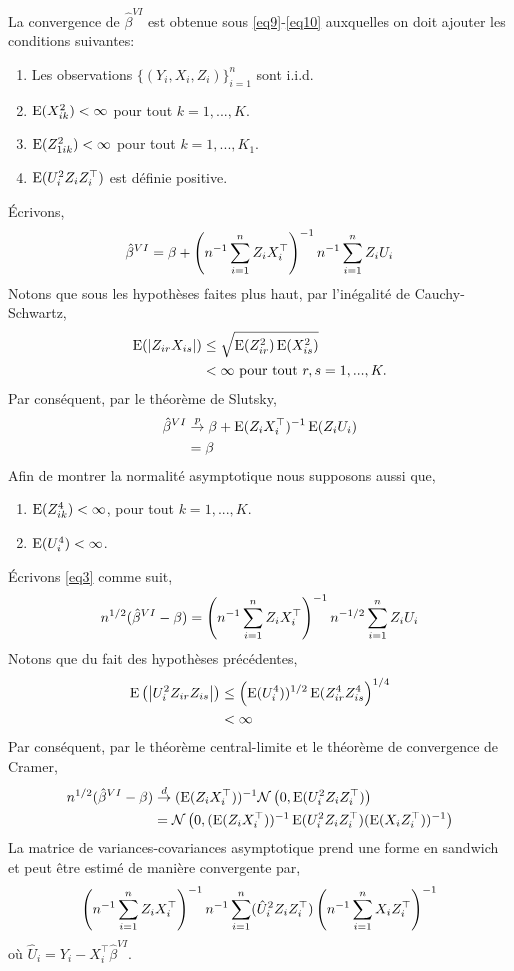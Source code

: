 La convergence de $\hat{\beta}^{VI}$ est obtenue sous \eqref{eq9}-\eqref{eq10} auxquelles on doit 
ajouter les conditions suivantes:
\begin{enumerate}[label = (B.\arabic*)]
\item Les observations $\{(Y_i, X_i, Z_i)\}_{i=1}^n$ sont i.i.d.
\item $\operatorname{E}(X_{ik}^2) < \infty$ pour tout $k=1,...,K$.
\item $\operatorname{E}(Z_{1ik}^2) < \infty$ pour tout $k=1,...,K_1$.
\item $\operatorname{E}(U_i^2Z_iZ_i^\top)$ est définie positive.
\end{enumerate}
\'Ecrivons,
\begin{align}
\hat{\beta}^{VI} = \beta + \left(n^{-1}\sum_{i=1}^n Z_iX_i^\top\right)^{-1}n^{-1}\sum_{i=1}^n Z_iU_i
\label{eq3}
\end{align}
Notons que sous les hypothèses faites plus haut, par l'inégalité de Cauchy-Schwartz,
\begin{align*}
\operatorname{E}(\left\vert {Z_{ir}X_{is}} \right\vert) &\leq \sqrt{\operatorname{E}(Z_{ir}^2)\operatorname{E}(X_{is}^2)}\\
&< \infty \ \textrm{pour tout} \ r, s = 1,...,K.
\end{align*}
Par conséquent, par le théorème de Slutsky,
\begin{align*}
\hat{\beta}^{VI}  &\overset{p}{\rightarrow} \beta + \operatorname{E}(Z_iX_i^\top)^{-1}\operatorname{E}(Z_iU_i)\\
&= \beta
\end{align*}
Afin de montrer la normalité asymptotique nous supposons aussi que,
\begin{enumerate}[label = (B.\arabic*), resume]
\item $\operatorname{E}(Z_{ik}^4) < \infty$, pour tout $k=1,...,K$. 
\item $\operatorname{E}(U_i^4)<\infty$.
\end{enumerate}
\'Ecrivons \eqref{eq3} comme suit,
\begin{align*}
n^{1/2}(\hat{\beta}^{VI} - \beta ) = \left(n^{-1}\sum_{i=1}^n Z_iX_i^\top\right)^{-1}n^{-1/2} \sum_{i=1}^n Z_iU_i
\end{align*}
Notons que du fait des hypothèses précédentes,
\begin{align*}
\operatorname{E}\left(\left\vert {U_i^2Z_{ir}Z_{is}} \right\vert\right) &\leq \left(\operatorname{E}(U_i^4))^{1/2}\operatorname{E}(Z_{ir}^4Z_{is}^4\right)^{1/4}\\
& < \infty
\end{align*}
Par conséquent, par le théorème central-limite et le théorème de convergence de Cramer,
\begin{align*}
n^{1/2}(\hat{\beta}^{VI} - \beta ) &\overset{d}{\rightarrow} (\operatorname{E}(Z_iX_i^\top))^{-1}\mathcal{N}\left(0,\operatorname{E}(U_i^2Z_iZ_i^\top)\right)\\
&=\mathcal{N}\left(0,  (\operatorname{E}(Z_iX_i^\top))^{-1}\operatorname{E}(U_i^2Z_iZ_i^\top) (\operatorname{E}(X_iZ_i^\top))^{-1}\right)
\end{align*}
La matrice de variances-covariances asymptotique prend une forme en sandwich et peut être estimé de manière convergente par,
\begin{align*}
\left(n^{-1}\sum_{i=1}^n Z_iX_i^\top\right)^{-1} n^{-1} \sum_{i=1}^n (\hat{U}_i^2Z_iZ_i^\top) \left(n^{-1}\sum_{i=1}^n X_iZ_i^\top\right)^{-1}
\end{align*}
où $\hat{U}_i = Y_i - X_i^\top\hat{\beta}^{VI}$.

